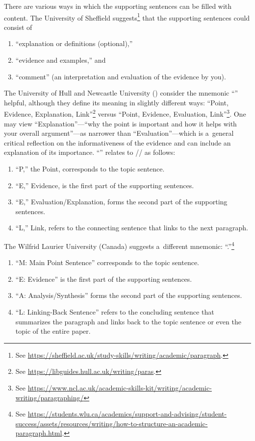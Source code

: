 There are various ways in which the supporting sentences can be filled with content. The University of Sheffield suggests\footnote{See \url{https://sheffield.ac.uk/study-skills/writing/academic/paragraph}.} that the supporting sentences could consist of
\begin{enumerate}
	\item ``explanation or definitions (optional),''
	\item ``evidence and examples,'' and
	\item ``comment'' (an interpretation and evaluation of the evidence by you).
\end{enumerate}
The University of Hull and Newcastle University () consider the mnemonic ``'' helpful, although they define its meaning in slightly different ways: ``Point, Evidence, Explanation, Link''\footnote{See \url{https://libguides.hull.ac.uk/writing/paras}.} versus ``Point, Evidence, Evaluation, Link''\footnote{See \url{https://www.ncl.ac.uk/academic-skills-kit/writing/academic-writing/paragraphing/}}. One may view ``Explanation''---``why the point is important and how it helps with your overall argument''---as narrower than ``Evaluation''---which is a~general critical reflection on the informativeness of the evidence and can include an explanation of its importance. ``'' relates to \slash {}\slash {} as follows:
\begin{enumerate}
	\item ``P,'' the Point, corresponds to the topic sentence.
	\item ``E,'' Evidence, is the first part of the supporting sentences.
	\item ``E,'' Evaluation/Explanation, forms the second part of the supporting sentences.
	\item ``L,'' Link, refers to the connecting sentence that links to the next paragraph.
\end{enumerate}

The Wilfrid Laurier University (Canada) suggests a~different mnemonic: ``.''\footnote{See \url{https://students.wlu.ca/academics/support-and-advising/student-success/assets/resources/writing/how-to-structure-an-academic-paragraph.html}.}
\begin{enumerate}
	\item ``M: Main Point Sentence'' corresponds to the topic sentence.
	\item ``E: Evidence'' is the first part of the supporting sentences.
	\item ``A: Analysis/Synthesis'' forms the second part of the supporting sentences.
	\item ``L: Linking-Back Sentence'' refers to the concluding sentence that summarizes the paragraph and links back to the topic sentence or even the topic of the entire paper.
\end{enumerate}

